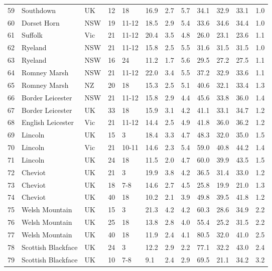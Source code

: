 \begin{center}
\begin{landscape}
\begin{longtable}{|p{0.4in}|p{0.9in}|p{0.7in}|p{0.4in}|p{0.45in}|p{0.45in}|p{0.45in}|p{0.45in}|p{0.45in}|p{0.45in}|p{0.45in}|p{0.45in}|}
 59 &  Southdown &  UK & 12 &  18 & 16.9 & 2.7 & 5.7 & 34.1 & 32.9 & 33.1 & 1.0 \\ 
 60 &  Dorset Horn &  NSW & 19 &  11-12 & 18.5 & 2.9 & 5.4 & 33.6 & 34.6 & 34.4 & 1.0 \\ 
 61 &  Suffolk &  Vic & 21 &  11-12 & 20.4 & 3.5 & 4.8 & 26.0 & 23.1 & 23.6 & 1.1 \\ 
 62 &  Ryeland &  NSW & 21 &  11-12 & 15.8 & 2.5 & 5.5 & 31.6 & 31.5 & 31.5 & 1.0 \\ 
 63 &  Ryeland &  NSW & 16 &  24 & 11.2 & 1.7 & 5.6 & 29.5 & 27.2 & 27.5 & 1.1 \\ 
 64 &  Romney Marsh &  NSW & 21 &  11-12 & 22.0 & 3.4 & 5.5 & 37.2 & 32.9 & 33.6 & 1.1 \\ 
 65 &  Romney Marsh &  NZ & 20 &  18 & 15.3 & 2.5 & 5.1 & 40.6 & 32.1 & 33.4 & 1.3 \\ 
 66 &  Border Leicester &  NSW & 21 &  11-12 & 15.8 & 2.9 & 4.4 & 45.6 & 33.8 & 36.0 & 1.4 \\ 
 67 &  Border Leicester &  UK & 33 &  18 & 15.9 & 3.1 & 4.2 & 41.1 & 33.1 & 34.7 & 1.2 \\ 
 68 &  English Leicester &  Vic & 21 &  11-12 & 14.4 & 2.5 & 4.9 & 41.8 & 36.0 & 36.2 & 1.2 \\ 
 69 &  Lincoln &  UK & 15 &  3 & 18.4 & 3.3 & 4.7 & 48.3 & 32.0 & 35.0 & 1.5 \\ 
 70 &  Lincoln &  Vic & 21 &  10-11 & 14.6 & 2.3 & 5.4 & 59.0 & 40.8 & 44.2 & 1.4 \\ 
 71 &  Lincoln &  UK & 24 &  18 & 11.5 & 2.0 & 4.7 & 60.0 & 39.9 & 43.5 & 1.5 \\ 
 72 &  Cheviot &  UK & 21 &  3 & 19.9 & 3.8 & 4.2 & 36.5 & 31.4 & 33.0 & 1.2 \\ 
 73 &  Cheviot &  UK & 18 &  7-8 & 14.6 & 2.7 & 4.5 & 25.8 & 19.9 & 21.0 & 1.3 \\ 
 74 &  Cheviot &  UK & 40 &  18 & 10.2 & 2.1 & 3.9 & 49.8 & 39.5 & 41.8 & 1.2 \\ 
 75 &  Welsh Mountain &  UK & 15 &  3 & 21.3 & 4.2 & 4.2 & 60.3 & 28.6 & 34.9 & 2.2 \\ 
 76 &  Welsh Mountain &  UK & 25 &  18 & 13.8 & 2.8 & 4.0 & 55.4 & 25.2 & 31.5 & 2.2 \\ 
 77 &  Welsh Mountain &  UK & 40 &  18 & 11.9 & 2.4 & 4.1 & 80.5 & 32.0 & 41.0 & 2.5 \\ 
 78 &  Scottish Blackface &  UK & 24 &  3 & 12.2 & 2.9 & 2.2 & 77.1 & 32.2 & 43.0 & 2.4 \\ 
 79 &  Scottish Blackface &  UK & 10 &  7-8 & 9.1 & 2.4 & 2.9 & 69.5 & 21.1 & 34.2 & 3.2 \\ 

\end{longtable}
\end{landscape}
\end{center}
